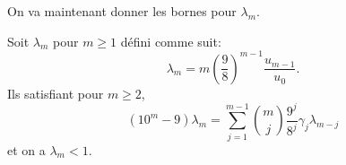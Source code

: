 \noindent On va maintenant donner les bornes pour $\lambda_{m}$.
\begin{prop}
	Soit $\lambda_{m}$ pour $m \ge 1$ d\'efini comme suit:
	\begin{equation}
		\lambda_{m} = m \left( \frac{9}{8} \right)^{m-1}\frac{u_{m-1}}{u_{0}}.
	\end{equation}
	Ils satisfiant pour $m\ge2$,
	\begin{equation}
		(10^{m}-9)\lambda_{m} = \sum_{j=1}^{m-1} \binom{m}{j}
		\frac{9^{j}}{8^{j}} \gamma_{j} \lambda_{m-j}
	\end{equation}
	et on a $\lambda_{m} < 1$.
\end{prop}%
